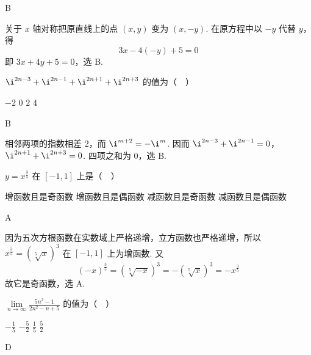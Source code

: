 \documentclass[UTF8,a4paper,oneside,11pt]{ctexbook}
\begin{document}
\begin{answer}
B
\end{answer}

\begin{solution}
关于 \(x\) 轴对称把原直线上的点 \((x,y)\) 变为 \((x,-y)\). 在原方程中以 \(-y\) 代替 \(y\)，得
\[
3x-4(-y)+5=0
\]
即 \(3x+4y+5=0\)，选 B.
\end{solution}

\begin{problem}
\(\i^{2n-3}+\i^{2n-1}+\i^{2n+1}+\i^{2n+3}\) 的值为（\(\quad\)）

\choices
    {\(-2\)}
    {\(0\)}
    {\(2\)}
    {\(4\)}
\end{problem}

\begin{answer}
B
\end{answer}

\begin{solution}
相邻两项的指数相差 \(2\)，而 \(\i^{m+2}=-\i^m\). 因而
\(\i^{2n-3}+\i^{2n-1}=0\)，\(\i^{2n+1}+\i^{2n+3}=0\).
四项之和为 \(0\)，选 B.
\end{solution}

\begin{problem}
\(y=x^{\frac{3}{5}}\) 在 \([-1,1]\) 上是（\(\quad\)）

\choices
    {增函数且是奇函数}
    {增函数且是偶函数}
    {减函数且是奇函数}
    {减函数且是偶函数}
\end{problem}

\begin{answer}
A
\end{answer}

\begin{solution}
因为五次方根函数在实数域上严格递增，立方函数也严格递增，所以 \(x^{\frac{3}{5}}=\left(\sqrt[5]{x}\right)^3\) 在 \([-1,1]\) 上为增函数. 又
\[
(-x)^{\frac{3}{5}}=\left(\sqrt[5]{-x}\right)^3=-\left(\sqrt[5]{x}\right)^3=-x^{\frac{3}{5}}
\]
故它是奇函数，选 A.
\end{solution}

\begin{problem}
\(\displaystyle\lim\limits_{n\to\infty}\frac{5n^2-1}{2n^2-n+5}\) 的值为（\(\quad\)）

\choices
    {\(-\frac{1}{5}\)}
    {\(-\frac{5}{2}\)}
    {\(\frac{1}{5}\)}
    {\(\frac{5}{2}\)}
\end{problem}

\begin{answer}
D
\end{answer}
\end{document}
